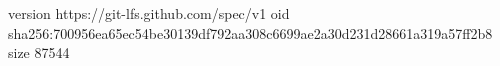 version https://git-lfs.github.com/spec/v1
oid sha256:700956ea65ec54be30139df792aa308c6699ae2a30d231d28661a319a57ff2b8
size 87544
